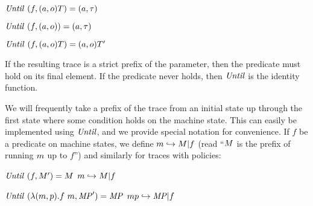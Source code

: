 \documentclass[acmsmall,review,anonymous]{acmart}\settopmatter{printfolios=true,printccs=false,printacmref=false}
\begin{document}
{  \begin{center}
  \begin{minipage}{.3\textwidth}
             {\(\mathit{Until}~(f,(a,o)T) = (a,\tau)\)}
  \end{minipage}
%
  \begin{minipage}{.3\textwidth}
  \judgment{}
           {\(\mathit{Until}~(f,(a,o)) = (a,\tau)\)}
%
  \end{minipage}
  \begin{minipage}{.3\textwidth}
              {\(\mathit{Until}~(f,(a,o)T) = (a,o)T'\)}
  \end{minipage}
  \end{center}
%
If the resulting trace is a strict prefix of the parameter, then the
predicate must hold on its final element. If the predicate never holds, then
\(\mathit{Until}\) is the identity function.



We will frequently take a prefix of the trace from an initial state up
through the first state where some condition holds on the machine state.
This can easily be implemented using \(\mathit{Until}\), and we provide special notation
for convenience.
%
If \(f\) be a predicate on machine states, we define \(m
\hookrightarrow M | f\) (read ``\(M\) is the prefix of
running \(m\) up to \(f\)'') and similarly for traces with policies:

\begin{center}
\begin{minipage}{.3\textwidth}
            {\(\mathit{Until}~(f,M')
              = M\)}
            {\(m \hookrightarrow M | f\)}
\end{minipage}
\begin{minipage}{.6\textwidth}
            {\(\mathit{Until}~(\lambda (m,p).f\ m,\mathit{MP}') = \mathit{MP}\)}
         {\(mp \hookrightarrow \mathit{MP} | f\)}
\end{minipage}
\end{center}

}
\end{document}
